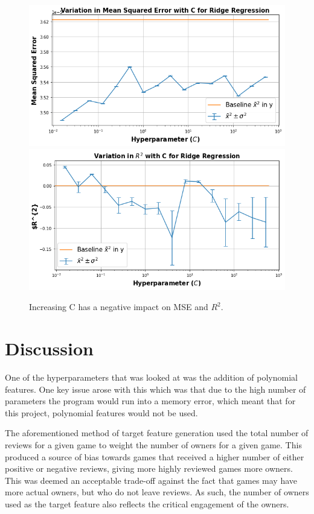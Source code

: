 \begin{figure}[!h]
\begin{small}
\centering
\linespread{1.0}
\includegraphics[width=0.8\linewidth]{pics/Ridge_MSE.png}
\includegraphics[width=0.8\linewidth]{pics/Ridge_R2.png}
\caption{Increasing C has a negative impact on MSE and $R^2$.}
\label{fig:fig2}
\end{small}
\end{figure}


\section{Discussion}

One of the hyperparameters that was looked at was the addition of polynomial features. One key issue arose with this which was that due to the high number of parameters the program would run into a memory error, which meant that for this project, polynomial features would not be used.

The aforementioned method of target feature generation used the total number of reviews for a given game to weight the number of owners for a given game. This produced a source of bias towards games that received a higher number of either positive or negative reviews, giving more highly reviewed games more owners. This was deemed an acceptable trade-off against the fact that games may have more actual owners, but who do not leave reviews. As such, the number of owners used as the target feature also reflects the critical engagement of the owners.

